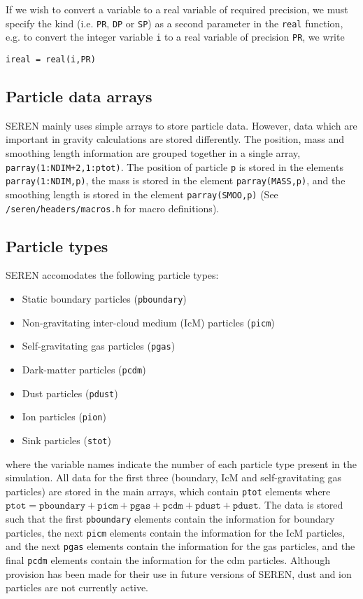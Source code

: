 \documentclass[a4paper]{article}
\newcommand{\var}[1]{\texttt{#1}}
\begin{document}
If we wish to convert a variable to a real variable of required precision, we must specify the kind (i.e. \var{PR}, \var{DP} or \var{SP}) as a second parameter in the \var{real} function, e.g. to convert the integer variable \var{i} to a real variable of precision \var{PR}, we write \newline

\indent \var{ireal = real(i,PR)} \\


\subsection{Particle data arrays} \label{SS:DATA}
SEREN mainly uses simple arrays to store particle data.  However, data which are important in gravity calculations are stored differently.  The position, mass and smoothing length information are grouped together in a single array, \var{parray(1:NDIM+2,1:ptot)}.  The position of particle \var{p} is stored in the elements \var{parray(1:NDIM,p)}, the mass is stored in the element \var{parray(MASS,p)}, and the smoothing length is stored in the element \var{parray(SMOO,p)} (See \var{/seren/headers/macros.h} for macro definitions). \newline


\subsection{Particle types}
SEREN accomodates the following particle types: 
\begin{itemize}
\item Static boundary particles (\var{pboundary})
\item Non-gravitating inter-cloud medium (IcM) particles (\var{picm})
\item Self-gravitating gas particles (\var{pgas})
\item Dark-matter particles (\var{pcdm})
\item Dust particles (\var{pdust})
\item Ion particles (\var{pion})
\item Sink particles (\var{stot})
\end{itemize}
where the variable names indicate the number of each particle type present 
in the simulation.  All data for the first three (boundary, IcM and self-gravitating gas particles) are stored in the main arrays, which contain \var{ptot} elements where $\var{ptot} = \var{pboundary} + \var{picm} + \var{pgas} + \var{pcdm} + \var{pdust} + \var{pdust}$.   
The data is stored such that the first \var{pboundary} elements contain the 
information for boundary particles, the next \var{picm} elements contain the 
information for the IcM particles, and the next \var{pgas} elements 
contain the information for the gas particles, and the final \var{pcdm} elements contain the information for the cdm particles.  Although provision has been made for their use in future versions of SEREN, dust and ion particles are not currently active.  
\end{document}
